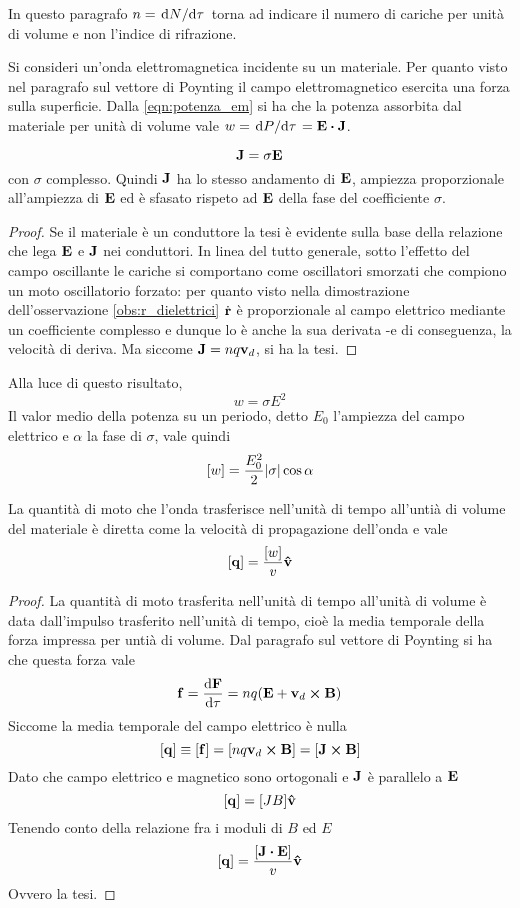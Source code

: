 In questo paragrafo $n=\dv*{N}{\tau}$ torna ad indicare il numero di cariche per unità di volume e non
l'indice di rifrazione.

Si consideri un'onda elettromagnetica incidente su un materiale. Per quanto visto nel
paragrafo sul vettore di Poynting il campo elettromagnetico esercita una forza sulla
superficie. Dalla \eqref{eqn:potenza_em} si ha che la potenza assorbita dal materiale per
unità di volume vale $w=\dv*{P}{\tau}=\vb{E} \vdot \vb{J}$.

\begin{obs}
    \[
        \vb{J}=\sigma\vb{E}
    \]
    con $\sigma$ complesso. Quindi $\vb{J}$ ha lo stesso andamento di $\vb{E}$, ampiezza proporzionale
    all'ampiezza di $\vb{E}$ ed è sfasato rispeto ad $\vb{E}$ della fase del coefficiente $\sigma$.
\end{obs}
\begin{proof}
    Se il materiale è un conduttore la tesi è evidente sulla base della relazione che lega $\vb{E}$ e $\vb{J}$
    nei conduttori. In linea del tutto generale, sotto l'effetto del campo oscillante le cariche si comportano
    come oscillatori smorzati che compiono un moto oscillatorio forzato: per quanto visto nella dimostrazione dell'osservazione
    \ref{obs:r_dielettrici} $\dot{\vb{r}}$ è proporzionale al campo elettrico mediante un coefficiente complesso
    e dunque lo è anche la sua derivata -e di conseguenza, la velocità di deriva.
    Ma siccome $\vb{J}=nq\vb{v}_d$, si ha la tesi.
\end{proof}
Alla luce di questo risultato,
\[
w=\sigma E^2
\]
Il valor medio della potenza su un periodo, detto $E_0$ l'ampiezza del campo elettrico
e $\alpha$ la fase di $\sigma$, vale quindi
\[
    [w]=\frac{E_0^2}{2}\abs{\sigma}\cos{\alpha}
\]

\begin{thm}
    La quantità di moto che l'onda trasferisce nell'unità di tempo all'untià di volume del materiale è diretta
    come la velocità di propagazione dell'onda e vale
    \[
        [\vb{q}]=\frac{[w]}{v}\vu{v}
    \]
\end{thm}
\begin{proof}
    La quantità di moto trasferita nell'unità di tempo all'unità di volume è data dall'impulso trasferito nell'unità di tempo,
    cioè la media temporale della forza impressa
    per untià di volume. Dal paragrafo sul vettore di Poynting si ha che questa forza vale
    \[
        \vb{f}=\dv{\vb{F}}{\tau}=nq(\vb{E}+\vb{v}_d\cp\vb{B})
    \]
    Siccome la media temporale del campo elettrico è nulla
    \[
        [\vb{q}]\equiv [\vb{f}]=[nq\vb{v}_d\cp\vb{B}]=[\vb{J}\cp\vb{B}]
    \]
    Dato che campo elettrico e magnetico sono ortogonali e $\vb{J}$ è parallelo a $\vb{E}$
    \[
        [\vb{q}]=[JB]\vu{v}
    \]
    Tenendo conto della relazione fra i moduli di $B$ ed $E$
    \[
        [\vb{q}]=\frac{[\vb{J\vdot\vb{E}}]}{v}\vu{v}
    \]
    Ovvero la tesi.
\end{proof}

